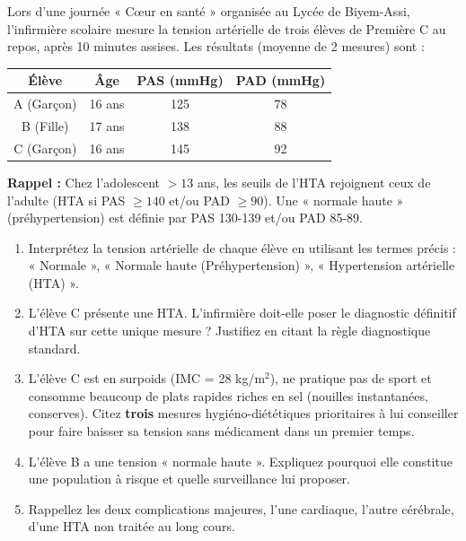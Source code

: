 \documentclass[11pt]{article}
\begin{document}
\begin{exercice}
Lors d'une journée « Cœur en santé » organisée au Lycée de Biyem-Assi, l'infirmière scolaire mesure la tension artérielle de trois élèves de Première C au repos, après 10 minutes assises. Les résultats (moyenne de 2 mesures) sont :
\begin{center}
\begin{tabular}{|c|c|c|c|}\hline
\textbf{Élève} & \textbf{Âge} & \textbf{PAS (mmHg)} & \textbf{PAD (mmHg)} \\ \hline
A (Garçon) & 16 ans & 125 & 78 \\ \hline
B (Fille) & 17 ans & 138 & 88 \\ \hline
C (Garçon) & 16 ans & 145 & 92 \\ \hline
\end{tabular}
\end{center}
\textbf{Rappel :} Chez l'adolescent $> 13$ ans, les seuils de l'HTA rejoignent ceux de l'adulte (HTA si PAS $\ge 140$ et/ou PAD $\ge 90$). Une « normale haute » (préhypertension) est définie par PAS 130-139 et/ou PAD 85-89.
\begin{enumerate}
    \item Interprétez la tension artérielle de chaque élève en utilisant les termes précis : « Normale », « Normale haute (Préhypertension) », « Hypertension artérielle (HTA) ».
    \item L'élève C présente une HTA. L'infirmière doit-elle poser le diagnostic définitif d'HTA sur cette unique mesure ? Justifiez en citant la règle diagnostique standard.
    \item L'élève C est en surpoids (IMC = 28 kg/m$^2$), ne pratique pas de sport et consomme beaucoup de plats rapides riches en sel (nouilles instantanées, conserves). Citez \textbf{trois} mesures hygiéno-diététiques prioritaires à lui conseiller pour faire baisser sa tension sans médicament dans un premier temps.
    \item L'élève B a une tension « normale haute ». Expliquez pourquoi elle constitue une population à risque et quelle surveillance lui proposer.
    \item Rappellez les deux complications majeures, l'une cardiaque, l'autre cérébrale, d'une HTA non traitée au long cours.
\end{enumerate}
\end{exercice}
\end{document}
